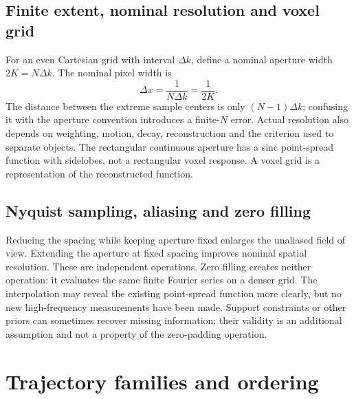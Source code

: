 \subsection{Finite extent, nominal resolution and voxel grid}
For an even Cartesian grid with interval \(\Delta k\), define a nominal aperture width \(2K=N\Delta k\). The nominal pixel width is
\begin{equation}
 \Delta x=\frac{1}{N\Delta k}=\frac{1}{2K}.
\end{equation}
The distance between the extreme sample centers is only \((N-1)\Delta k\); confusing it with the aperture convention introduces a finite-\(N\) error. Actual resolution also depends on weighting, motion, decay, reconstruction and the criterion used to separate objects. The rectangular continuous aperture has a sinc point-spread function with sidelobes, not a rectangular voxel response. A voxel grid is a representation of the reconstructed function.

\subsection{Nyquist sampling, aliasing and zero filling}
Reducing the spacing while keeping aperture fixed enlarges the unaliased field of view. Extending the aperture at fixed spacing improves nominal spatial resolution. These are independent operations. Zero filling creates neither operation: it evaluates the same finite Fourier series on a denser grid. The interpolation may reveal the existing point-spread function more clearly, but no new high-frequency measurements have been made. Support constraints or other priors can sometimes recover missing information; their validity is an additional assumption and not a property of the zero-padding operation.

\section{Trajectory families and ordering}
\label{sec:05:trajectory-families-and-ordering}
